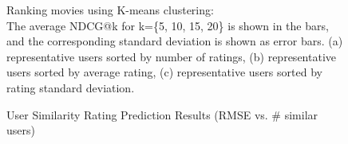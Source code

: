 \begin{figure}
{\begin{tabular}{ c c c}
\end{tabular}
}
\caption{Ranking movies using K-means clustering: 
\\The average NDCG@k for k=\{5, 10, 15, 20\} is shown in the bars, and the corresponding standard deviation is shown as error bars. (a) representative users sorted by number of ratings, (b) representative users sorted by average rating, (c) representative users sorted by rating standard deviation. }
\label{fig:ndcg}  
\end{figure}


\begin{figure}
\center
{}
\caption{User Similarity Rating Prediction Results (RMSE vs. \# similar users)}
\label{fig:user_similarity}  
\end{figure}




